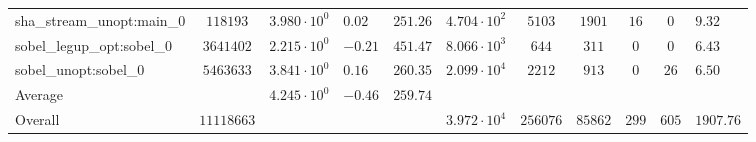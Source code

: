 \begin{tabular}{|l|c|HHc|c|c|c|c|cH|}
sha\_stream\_unopt:main\_0                      & $ 118193   $ & $ 3.980 \cdot 10^{0} $ & $ 0.02  $ & $ 251.26 $ & $ 4.704 \cdot 10^{2}  $ & $ 5103   $ & $ 1901  $ & $ 16  $ & $ 0   $ & $ 9.32    $ \\
sobel\_legup\_opt:sobel\_0                      & $ 3641402  $ & $ 2.215 \cdot 10^{0} $ & $ -0.21 $ & $ 451.47 $ & $ 8.066 \cdot 10^{3}  $ & $ 644    $ & $ 311   $ & $ 0   $ & $ 0   $ & $ 6.43    $ \\
sobel\_unopt:sobel\_0                           & $ 5463633  $ & $ 3.841 \cdot 10^{0} $ & $ 0.16  $ & $ 260.35 $ & $ 2.099 \cdot 10^{4}  $ & $ 2212   $ & $ 913   $ & $ 0   $ & $ 26  $ & $ 6.50    $ \\
\hline
Average                                         & $          $ & $ 4.245 \cdot 10^{0} $ & $ -0.46 $ & $ 259.74 $ & $                     $ & $        $ & $       $ & $     $ & $     $ & $         $ \\
\hline
Overall                                         & $ 11118663 $ & $                    $ & $       $ & $        $ & $ 3.972 \cdot 10^{4}  $ & $ 256076 $ & $ 85862 $ & $ 299 $ & $ 605 $ & $ 1907.76 $ \\
\hline
\end{tabular}
